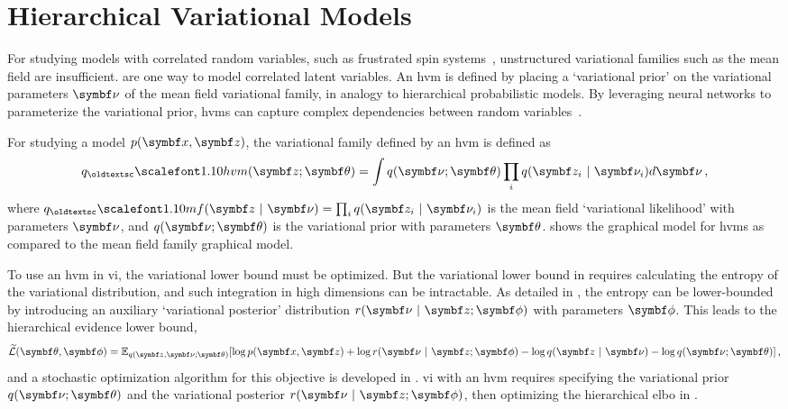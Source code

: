 \section{Hierarchical Variational Models}
For studying models with correlated random variables, such as frustrated spin systems~\citep{zdeborova2016statistical}, unstructured variational families such as the mean field are insufficient.  are one way to model correlated latent variables. An \gls{hvm} is defined by placing a `variational prior' on the variational parameters $\mbnu$ of the mean field variational family, in analogy to hierarchical probabilistic models. By leveraging neural networks to parameterize the variational prior, \glspl{hvm} can capture complex dependencies between random variables~\citep{ranganath2018black}.



For studying a model $p(\mbx, \mbz)$, the variational family defined by an \gls{hvm} is defined as
\begin{equation}
  q_\hvm(\mbz; \mbtheta) = \int q(\mbnu; \mbtheta) \prod_i q(\mbz_i \mid \mbnu_i) d\mbnu \, ,
  \label{eq:hvm}
\end{equation}
where $q_\mf(\mbz \mid \mbnu) = \prod_i q(\mbz_i \mid \mbnu_i)$ is the mean field `variational likelihood' with parameters $\mbnu$, and $q(\mbnu; \mbtheta)$ is the variational prior with parameters $\mbtheta$.  shows the graphical model for \glspl{hvm} as compared to the mean field family graphical model.

To use an \gls{hvm} in \gls{vi}, the variational lower bound must be optimized. But the variational lower bound in  requires calculating the entropy of the variational distribution, and such integration in high dimensions can be intractable. As detailed in \citet{ranganath2018black}, the entropy can be lower-bounded by introducing an auxiliary `variational posterior' distribution $r(\mbnu \mid \mbz; \mbphi)$ with parameters $\mbphi$. This leads to the hierarchical evidence lower bound,
\begin{equation}
  \widetilde{{\cL}}(\mbtheta, \mbphi) = \E_{q(\mbz, \mbnu; \mbtheta)}[ \log p(\mbx, \mbz) + \log r(\mbnu \mid \mbz; \mbphi) - \log q(\mbz \mid \mbnu) - \log q(\mbnu; \mbtheta)]\, ,
  \label{eq:hier-elbo}
\end{equation}
and a stochastic optimization algorithm for this objective is developed in \citep{ranganath2018black}. \gls{vi} with an \gls{hvm} requires specifying the variational prior $q(\mbnu; \mbtheta)$ and the variational posterior ${r(\mbnu \mid \mbz; \mbphi)}$, then optimizing the hierarchical \gls{elbo} in .

